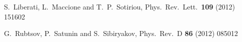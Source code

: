 \documentclass{webofc}
\begin{document}
\begin{thebibliography}{99}











 S.~Liberati, L.~Maccione and T.~P.~Sotiriou,
  Phys.\ Rev.\ Lett.\  {\bf 109} (2012) 151602



  G.~Rubtsov, P.~Satunin and S.~Sibiryakov,
  Phys.\ Rev.\ D {\bf 86} (2012) 085012




\end{thebibliography}
\end{document}

